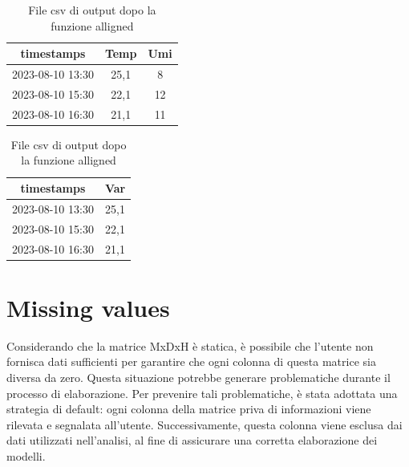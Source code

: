 \documentclass{rapportECL}
\begin{document}
\begin{table}[htp]
  \begin{minipage}{0.45\textwidth} %
    \centering
    \begin{tabular}{|c|c|c|}

      \hline
    timestamps & Temp & Umi\\
    \hline
    2023-08-10 13:30 & 25,1 & 8\\
    \hline
    2023-08-10 15:30 & 22,1 & 12\\
    \hline
    2023-08-10 16:30 & 21,1 & 11\\
    \hline
    
  
  \end{tabular}
  
  \caption{File di input dopo la funzione alligned}
  \end{minipage}
  \hfill %
  \begin{minipage}{0.45\textwidth} %
    \centering
    \begin{tabular}{|c|c|}

      \hline
    timestamps & Var\\
    \hline
    2023-08-10 13:30 & 25,1\\
    \hline
    2023-08-10 15:30 & 22,1\\
    \hline
    2023-08-10 16:30 & 21,1\\
    \hline
    
  
  \end{tabular}
  
  \caption{File csv di output dopo la funzione alligned}
  \end{minipage}
\end{table}


\section{Missing values}

Considerando che la matrice MxDxH è statica, è possibile che l'utente non fornisca dati sufficienti per garantire che ogni colonna di 
questa matrice sia diversa da zero. Questa situazione potrebbe generare problematiche durante il processo di elaborazione. 
Per prevenire tali problematiche, è stata adottata una strategia di default: ogni colonna della matrice priva di informazioni viene rilevata e segnalata 
all'utente. Successivamente, questa colonna viene esclusa dai dati utilizzati nell'analisi, al fine di assicurare una corretta elaborazione dei modelli.
\end{document}
